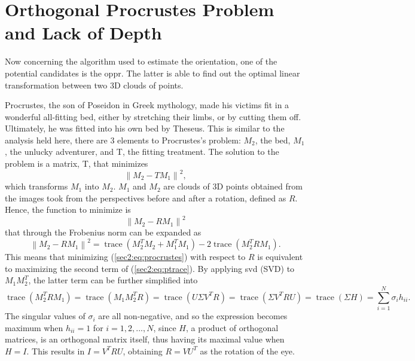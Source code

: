 
\section{Orthogonal Procrustes Problem and Lack of Depth}
\label{cha2:opprandsphere}

Now concerning the algorithm used to estimate the orientation, one of the potential candidates is the \acrfull{oppr}. The latter is able to find out the optimal linear transformation between two 3D clouds of points.

Procrustes, the son of Poseidon in Greek mythology, made his victims fit in a wonderful all-fitting bed, either by stretching their limbs, or by cutting them off. Ultimately, he was fitted into his own bed by Theseus. This is similar to the analysis held here, there are 3 elements to Procrustes's problem: $M_2$, the bed, $M_1$, the unlucky adventurer, and T, the fitting treatment. The solution to the problem is a matrix, T, that minimizes
\begin{equation}
\label{sec2:eq:procrustes}
\left \| M_2 - TM_1  \right \|^2 ,
\end{equation}
which transforms $M_1$ into $M_2$. $M_1$ and $M_2$ are clouds of 3D points obtained from the images took from the perspectives before and after a rotation, defined as $R$. Hence, the function to minimize is
\begin{equation}
\label{sec2:eq:ptrace}
\left \| M_2 - RM_1 \right \|^2 
\end{equation}
that through the Frobenius norm can be expanded as
\begin{equation}
\label{sec2:eq:ptrace}
\left \| M_2 - RM_1 \right \|^2 = \operatorname { trace } ( M_2^T M_2 + M_1^T M_1) - 2 \operatorname { trace } (M_2^T R M_1).
\end{equation}
This means that minimizing (\ref{sec2:eq:procrustes}) with respect to $R$ is equivalent to maximizing the second term of (\ref{sec2:eq:ptrace}). By applying \gls{svd} (SVD) to $M_1 M_2^T$, the latter term can be further simplified into
\begin{equation}
\label{sec2:eq:svd}
\operatorname { trace } (M_2^T R M_1) = \operatorname { trace } (M_1 M_2^T  R) = \operatorname { trace } ( U \Sigma V^T R) = \operatorname { trace } (\Sigma V^T R U) = \operatorname { trace } (\Sigma H )  = \sum _ { i = 1 } ^ { N } \sigma _ { i }h _ { i i } .
\end{equation}
The singular values of $\sigma _ { i }$ are all non-negative, and so the expression becomes maximum when $h _ { i i } = 1$ for $i=1,2,...,N$, since $H$, a product of orthogonal matrices, is an orthogonal matrix itself, thus having its maximal value when $H = I$. This results in $I = V^T R U$, obtaining $R=V U^T$ as the rotation of the eye.   

